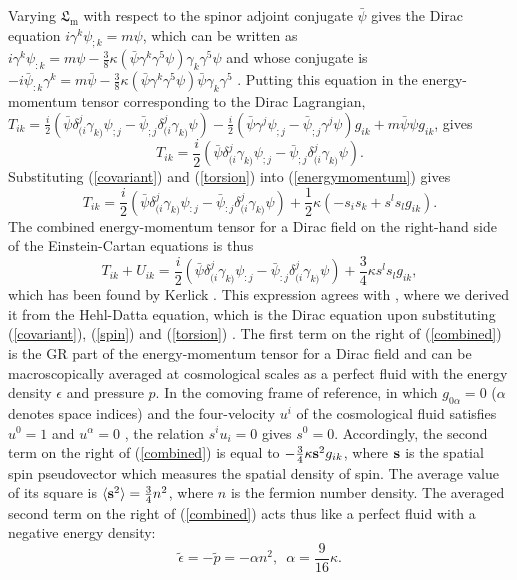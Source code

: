 \documentclass[prd,onecolumn,nofootinbib,showpacs]{revtex4}
\begin{document}
Varying $\mathfrak{L}_\textrm{m}$ with respect to the spinor adjoint conjugate $\bar{\psi}$ gives the Dirac equation $i\gamma^k\psi_{;k}=m\psi$, which can be written as $i\gamma^k\psi_{:k}=m\psi-\frac{3}{8}\kappa(\bar{\psi}\gamma^k\gamma^5\psi)\gamma_k\gamma^5\psi$ and whose conjugate is $-i\bar{\psi}_{:k}\gamma^k=m\bar{\psi}-\frac{3}{8}\kappa(\bar{\psi}\gamma^k\gamma^5\psi)\bar{\psi}\gamma_k\gamma^5$ \cite{Hehl,HD}.
Putting this equation in the energy-momentum tensor corresponding to the Dirac Lagrangian, $T_{ik}=\frac{i}{2}(\bar{\psi}\delta^j_{(i}\gamma_{k)}\psi_{;j}-\bar{\psi}_{;j}\delta^j_{(i}\gamma_{k)}\psi)-\frac{i}{2}(\bar{\psi}\gamma^j\psi_{;j}-\bar{\psi}_{;j}\gamma^j\psi)g_{ik}+m\bar{\psi}\psi g_{ik}$, gives
\begin{equation}
T_{ik}=\frac{i}{2}(\bar{\psi}\delta^j_{(i}\gamma_{k)}\psi_{;j}-\bar{\psi}_{;j}\delta^j_{(i}\gamma_{k)}\psi).
\label{energymomentum}
\end{equation}
Substituting (\ref{covariant}) and (\ref{torsion}) into (\ref{energymomentum}) gives
\begin{equation}
T_{ik}=\frac{i}{2}(\bar{\psi}\delta^j_{(i}\gamma_{k)}\psi_{:j}-\bar{\psi}_{:j}\delta^j_{(i}\gamma_{k)}\psi)+\frac{1}{2}\kappa(-s_i s_k+s^l s_l g_{ik}).
\label{second}
\end{equation}
The combined energy-momentum tensor for a Dirac field on the right-hand side of the Einstein-Cartan equations is thus
\begin{equation}
T_{ik}+U_{ik}=\frac{i}{2}(\bar{\psi}\delta^j_{(i}\gamma_{k)}\psi_{:j}-\bar{\psi}_{:j}\delta^j_{(i}\gamma_{k)}\psi)+\frac{3}{4}\kappa s^l s_l g_{ik},
\label{combined}
\end{equation}
which has been found by Kerlick \cite{Ker}.
This expression agrees with \cite{dark}, where we derived it from the Hehl-Datta equation, which is the Dirac equation upon substituting (\ref{covariant}), (\ref{spin}) and (\ref{torsion}) \cite{HD}.
The first term on the right of (\ref{combined}) is the GR part of the energy-momentum tensor for a Dirac field and can be macroscopically averaged at cosmological scales as a perfect fluid with the energy density $\epsilon$ and pressure $p$.
In the comoving frame of reference, in which $g_{0\alpha}=0$ ($\alpha$ denotes space indices) and the four-velocity $u^i$ of the cosmological fluid satisfies $u^0=1$ and $u^\alpha=0$ \cite{Ker}, the relation $s^i u_i=0$ gives $s^0=0$.
Accordingly, the second term on the right of (\ref{combined}) is equal to $-\frac{3}{4}\kappa{\bf s}^2 g_{ik}$, where ${\bf s}$ is the spatial spin pseudovector which measures the spatial density of spin.
The average value of its square is $\langle{\bf s}^2\rangle=\frac{3}{4}n^2$, where $n$ is the fermion number density.
The averaged second term on the right of (\ref{combined}) acts thus like a perfect fluid with a negative energy density:
\begin{equation}
\tilde{\epsilon}=-\tilde{p}=-\alpha n^2,\,\,\,\alpha=\frac{9}{16}\kappa.
\label{effective}
\end{equation}
\end{document}
